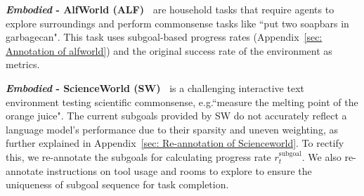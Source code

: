 \textbf{\textit{Embodied} - AlfWorld (ALF)~\citep{shridhar2020alfworld}} are
household tasks that require agents to explore surroundings and perform commonsense tasks 
like ``put two soapbars in garbagecan". 
This task uses subgoal-based progress rates (Appendix~\ref{sec: Annotation of alfworld}) and the original success rate of the environment as metrics. 

\textbf{\textit{Embodied} - ScienceWorld (SW)~\citep{wang2022scienceworld}}  is a challenging interactive text environment testing scientific commonsense, e.g.``measure the melting point of the orange juice".  The current subgoals provided by SW do not accurately reflect a language model's performance due to their sparsity and uneven weighting, as further explained in Appendix~\ref{sec: Re-annotation of Scienceworld}. To rectify this, we re-annotate the subgoals for calculating progress rate $r_t^{\text{subgoal}}$. We also re-annotate instructions on tool usage and rooms to explore to ensure the uniqueness of subgoal sequence for task completion.

